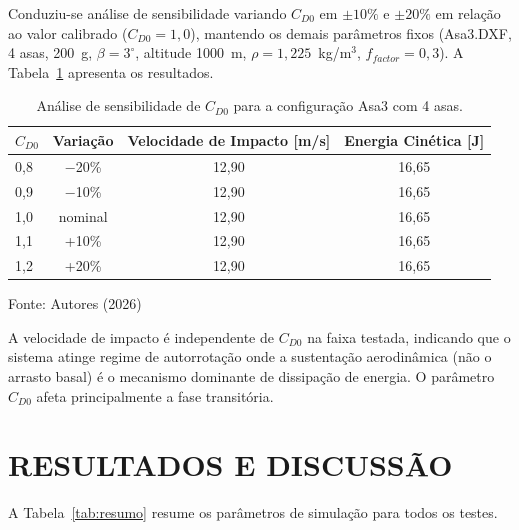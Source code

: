 \documentclass[12pt,fleqn]{article}
\begin{document}
Conduziu-se análise de sensibilidade variando $C_{D0}$ em $\pm10\%$ e $\pm20\%$ em relação ao valor calibrado ($C_{D0}=1,0$), mantendo os demais parâmetros fixos (Asa3.DXF, 4 asas, 200~g, $\beta=3^\circ$, altitude 1000~m, $\rho=1,225$~kg/m$^3$, $f_{factor}=0,3$). A Tabela~\ref{tab:cd0} apresenta os resultados.

\begin{table}[htbp]
\caption{Análise de sensibilidade de $C_{D0}$ para a configuração Asa3 com 4 asas.}
\centering
\begin{tabular*}{\textwidth}{@{\extracolsep{\fill}}lccc}
\hline
$C_{D0}$ & Variação & Velocidade de Impacto [m/s] & Energia Cinética [J] \\
\hline
0,8 & $-$20\% & 12,90 & 16,65 \\
0,9 & $-$10\% & 12,90 & 16,65 \\
1,0 & nominal & 12,90 & 16,65 \\
1,1 & +10\% & 12,90 & 16,65 \\
1,2 & +20\% & 12,90 & 16,65 \\
\hline
\end{tabular*}
{\footnotesize\centering Fonte: Autores (2026)\par}
\label{tab:cd0}
\end{table}

A velocidade de impacto é independente de $C_{D0}$ na faixa testada, indicando que o sistema atinge regime de autorrotação onde a sustentação aerodinâmica (não o arrasto basal) é o mecanismo dominante de dissipação de energia. O parâmetro $C_{D0}$ afeta principalmente a fase transitória.


\section{RESULTADOS E DISCUSSÃO}

A Tabela~\ref{tab:resumo} resume os parâmetros de simulação para todos os testes.
\end{document}

